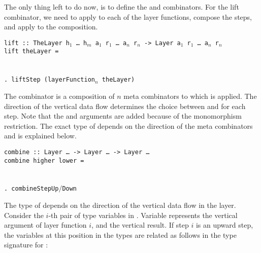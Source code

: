 \documentclass[preprint,natbib]{sigplanconf}
\begin{document}

The only thing left to do now, is to define the  and  combinators. For the lift combinator, we need to apply  to each of the layer functions, compose the steps, and apply  to the composition. 

\begin{small}
\begin{tabbing}
{\tt lift}\verb| :: |{\tt TheLayer h$_1$ \dots ~h$_m$ a$_1$ r$_1$ \dots ~a$_n$ r$_n$ -> Layer a$_1$ r$_1$ \dots ~a$_n$ r$_n$}\\
{\tt li}\={\tt ft t}\={\tt heLayer = }\\
\\
\>\>{\tt \dots}\\ 
\>\>\verb|. lift|{\tt Step (layerFunction$_n$ theLayer)}
\end{tabbing}
\end{small}%


The  combinator is a composition of $n$  meta combinators to which  is applied. The direction of the vertical data flow determines the choice between  and  for each step. \bc Note that the  and  arguments are added because of the monomorphism restriction. \ec The exact type of  depends on the direction of the meta combinators and is explained below. 

\begin{small}
\begin{tabbing}
{\tt combine}\verb| :: |{\tt Layer \dots}\verb| -> |{\tt Layer \dots}\verb| -> |{\tt Layer \dots }\\
{\tt co}\={\tt mbin}\={\tt e higher lower = }\\
\\
\>\>{\tt \dots}\\ 
\>\>\verb|. combine|{\tt StepUp$/$Down}\\
\>
\end{tabbing}
\end{small}

The type of  depends on the direction of the vertical data flow in the layer. Consider the $i$-th pair of  type variables in . Variable  represents the vertical argument of layer function $i$, and  the vertical result. If step $i$ is an upward step, the variables at this position in the  types are related as follows in the type signature for :
\end{document}
